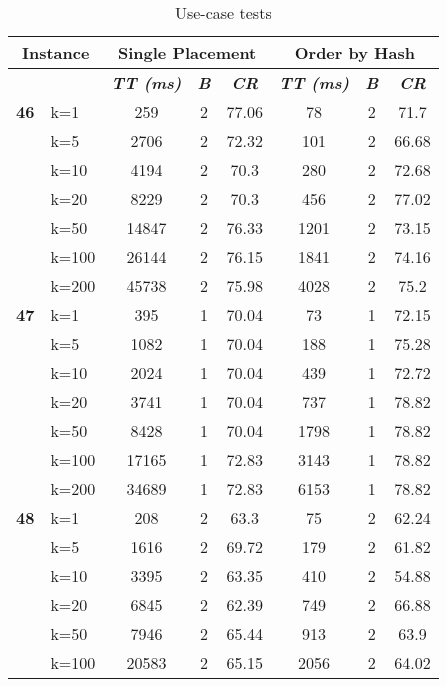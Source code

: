     \begin{table}[htbp]
    \caption{Use-case tests}
    \centering
    \begin{tabular}{|l|l|c|c|c|c|c|c|}
    
    \multicolumn{ 2}{|c|}{\textbf{Instance}} & \multicolumn{ 3}{c|}{\textbf{Single Placement}} & \multicolumn{ 3}{c|}{\textbf{Order by Hash}} \\ \hline
    \multicolumn{ 2}{|l|}{} & \textbf{\textit{TT (ms)}} & \textbf{\textit{B}} & \textbf{\textit{CR}} & \textbf{\textit{TT (ms)}} & \textbf{\textit{B}} & \textbf{\textit{CR}} \\ \hline
    \multicolumn{1}{|r|}{\textbf{46}} & k=1 & 259 & 2 & 77.06 & 78 & 2 & 71.7 \\ 
     & k=5 & 2706 & 2 & 72.32 & 101 & 2 & 66.68 \\ 
     & k=10 & 4194 & 2 & 70.3 & 280 & 2 & 72.68 \\ 
     & k=20 & 8229 & 2 & 70.3 & 456 & 2 & 77.02 \\ 
     & k=50 & 14847 & 2 & 76.33 & 1201 & 2 & 73.15 \\ 
     & k=100 & 26144 & 2 & 76.15 & 1841 & 2 & 74.16 \\ 
     & k=200 & 45738 & 2 & 75.98 & 4028 & 2 & 75.2 \\ \hline
    \multicolumn{1}{|r|}{\textbf{47}} & k=1 & 395 & 1 & 70.04 & 73 & 1 & 72.15 \\ 
     & k=5 & 1082 & 1 & 70.04 & 188 & 1 & 75.28 \\ 
     & k=10 & 2024 & 1 & 70.04 & 439 & 1 & 72.72 \\ 
     & k=20 & 3741 & 1 & 70.04 & 737 & 1 & 78.82 \\ 
     & k=50 & 8428 & 1 & 70.04 & 1798 & 1 & 78.82 \\ 
     & k=100 & 17165 & 1 & 72.83 & 3143 & 1 & 78.82 \\ 
     & k=200 & 34689 & 1 & 72.83 & 6153 & 1 & 78.82 \\ \hline
    \multicolumn{1}{|r|}{\textbf{48}} & k=1 & 208 & 2 & 63.3 & 75 & 2 & 62.24 \\ 
     & k=5 & 1616 & 2 & 69.72 & 179 & 2 & 61.82 \\ 
     & k=10 & 3395 & 2 & 63.35 & 410 & 2 & 54.88 \\ 
     & k=20 & 6845 & 2 & 62.39 & 749 & 2 & 66.88 \\ 
     & k=50 & 7946 & 2 & 65.44 & 913 & 2 & 63.9 \\ 
     & k=100 & 20583 & 2 & 65.15 & 2056 & 2 & 64.02 \\ 

\end{tabular}
\end{table}
